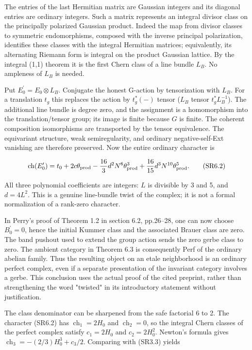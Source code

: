 The entries of the last Hermitian matrix are Gaussian integers and its diagonal entries are ordinary integers. Such a matrix represents an integral divisor class on the principally polarized Gaussian product. Indeed the map from divisor classes to symmetric endomorphisms, composed with the inverse principal polarization, identifies these classes with the integral Hermitian matrices; equivalently, its alternating Riemann form is integral on the product Gaussian lattice. By the integral (1,1) theorem it is the first Chern class of a line bundle \(L_B\). No ampleness of \(L_B\) is needed.

Put \(E_0^{\prime}=E_0\otimes L_B\). Conjugate the honest G-action by tensorization with \(L_B\). For a translation \(t_g\) this replaces the action by \(t_g^*(-)\) tensor (\(L_B\) tensor \(t_g^*L_B^{-1}\)). The additional line bundle is degree zero, and the assignment is a homomorphism into the translation/tensor group; its image is finite because \(G\) is finite. The coherent composition isomorphisms are transported by the tensor equivalence. The equivariant structure, weak semiregularity, and ordinary negative-self-Ext vanishing are therefore preserved. Now the entire ordinary character is

\[
\operatorname{ch}(E_0^{\prime})=t_0+2c\theta_{\rm prod}-\frac{16}{3}d^2N^6\theta_{\rm prod}^3+\frac{16}{15}d^3N^{10}\theta_{\rm prod}^5.\tag{SR6.2}
\]

All three polynomial coefficients are integers: \(L\) is divisible by 3 and 5, and \(d=4L^2\). This is a genuine line-bundle twist of the complex; it is not a formal normalization of a rank-zero character.

In Perry's proof of Theorem 1.2 in section 6.2, pp.26--28, one can now choose \(B_0^{\prime}=0\), hence the initial Kummer class and the associated Brauer class are zero. The band pushout used to extend the group action sends the zero gerbe class to zero. The ambient category in Theorem 6.3 is consequently Perf of the ordinary abelian family. Thus the resulting object on an etale neighborhood is an ordinary perfect complex, even if a separate presentation of the invariant category involves a gerbe. This conclusion uses the actual proof of the cited preprint, rather than strengthening the word "twisted" in its introductory statement without justification. \cite{SR-Perry2026}

The class denominator can be sharpened from the safe factorial 6 to 2. The character (SR6.2) has \(\operatorname{ch}_1=2H_0\) and \(\operatorname{ch}_2=0\), so the integral Chern classes of the perfect complex satisfy \(c_1=2H_0\) and \(c_2=2H_0^2\). Newton's formula gives \(\operatorname{ch}_3=-(2/3)H_0^3+c_3/2\). Comparing with (SR3.3) yields

